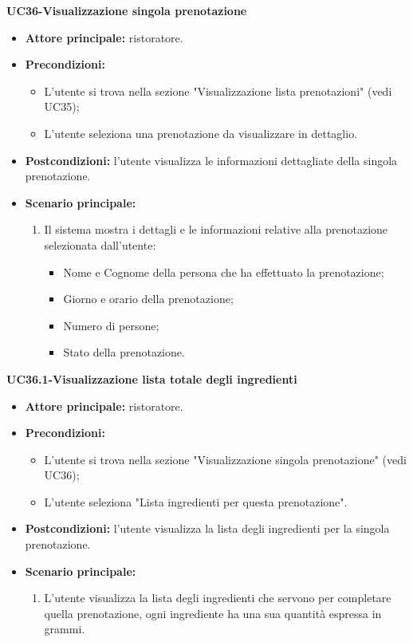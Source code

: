 \textbf{UC36-Visualizzazione singola prenotazione}
\begin{itemize}
    \item \textbf{Attore principale:} ristoratore.
    \item \textbf{Precondizioni:} 
    \begin{itemize}
        \item L'utente si trova nella sezione "Visualizzazione lista prenotazioni" (vedi UC35);
        \item L'utente seleziona una prenotazione da visualizzare in dettaglio.
    \end{itemize}
    \item \textbf{Postcondizioni:} l'utente visualizza le informazioni dettagliate della singola prenotazione.
    \item \textbf{Scenario principale:}
    \begin{enumerate}
        \item Il sistema mostra i dettagli e le informazioni relative alla prenotazione selezionata dall'utente:
        \begin{itemize}
            \item Nome e Cognome della persona che ha effettuato la prenotazione;
            \item Giorno e orario della prenotazione;
            \item Numero di persone;
            \item Stato della prenotazione.
        \end{itemize}
    \end{enumerate}
\end{itemize}

\textbf{UC36.1-Visualizzazione lista totale degli ingredienti}
\begin{itemize}
    \item \textbf{Attore principale:} ristoratore.
    \item \textbf{Precondizioni:} 
    \begin{itemize}
        \item L'utente si trova nella sezione "Visualizzazione singola prenotazione" (vedi UC36);
        \item L'utente seleziona "Lista ingredienti per questa prenotazione".
    \end{itemize}
    \item \textbf{Postcondizioni:} l'utente visualizza la lista degli ingredienti per la singola prenotazione.
    \item \textbf{Scenario principale:}
    \begin{enumerate}
        \item L'utente visualizza la lista degli ingredienti che servono per completare quella prenotazione, ogni ingrediente ha una sua quantità espressa in grammi.
    \end{enumerate}
\end{itemize}

